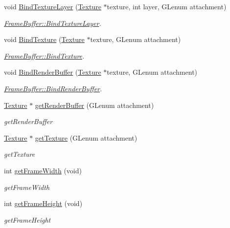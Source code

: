 \begin{DoxyCompactItemize}
\item 
void \hyperlink{classEngine_1_1FrameBuffer_a636279ddc844348854635f660840fba1}{Bind\+Texture\+Layer} (\hyperlink{classEngine_1_1Texture}{Texture} $\ast$texture, int layer, G\+Lenum attachment)
\begin{DoxyCompactList}\small\item\em \hyperlink{classEngine_1_1FrameBuffer_a636279ddc844348854635f660840fba1}{Frame\+Buffer\+::\+Bind\+Texture\+Layer}. \end{DoxyCompactList}\item 
void \hyperlink{classEngine_1_1FrameBuffer_a29c67a4d8a1f3037e94d9c0664eef744}{Bind\+Texture} (\hyperlink{classEngine_1_1Texture}{Texture} $\ast$texture, G\+Lenum attachment)
\begin{DoxyCompactList}\small\item\em \hyperlink{classEngine_1_1FrameBuffer_a29c67a4d8a1f3037e94d9c0664eef744}{Frame\+Buffer\+::\+Bind\+Texture}. \end{DoxyCompactList}\item 
void \hyperlink{classEngine_1_1FrameBuffer_afe51f4e52ebb753c7bbd3f780d92f3d8}{Bind\+Render\+Buffer} (\hyperlink{classEngine_1_1Texture}{Texture} $\ast$texture, G\+Lenum attachment)
\begin{DoxyCompactList}\small\item\em \hyperlink{classEngine_1_1FrameBuffer_afe51f4e52ebb753c7bbd3f780d92f3d8}{Frame\+Buffer\+::\+Bind\+Render\+Buffer}. \end{DoxyCompactList}\item 
\hyperlink{classEngine_1_1Texture}{Texture} $\ast$ \hyperlink{classEngine_1_1FrameBuffer_ab34cd5630598712e9961caa47aba6fcf}{get\+Render\+Buffer} (G\+Lenum attachment)
\begin{DoxyCompactList}\small\item\em get\+Render\+Buffer \end{DoxyCompactList}\item 
\hyperlink{classEngine_1_1Texture}{Texture} $\ast$ \hyperlink{classEngine_1_1FrameBuffer_a991caed6a2eb5bc2f21a37e741dc261b}{get\+Texture} (G\+Lenum attachment)
\begin{DoxyCompactList}\small\item\em get\+Texture \end{DoxyCompactList}\item 
int \hyperlink{classEngine_1_1FrameBuffer_a2f9f76269e95a76a889b7ea468e5fc7f}{get\+Frame\+Width} (void)
\begin{DoxyCompactList}\small\item\em get\+Frame\+Width \end{DoxyCompactList}\item 
int \hyperlink{classEngine_1_1FrameBuffer_a77a9253035765ef36d0def08a68068d4}{get\+Frame\+Height} (void)
\begin{DoxyCompactList}\small\item\em get\+Frame\+Height \end{DoxyCompactList}\end{DoxyCompactItemize}


